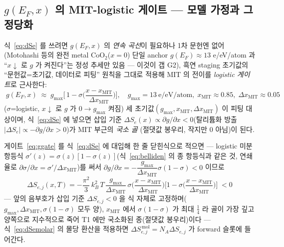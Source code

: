 \subsection{$g(E_F,x)$ 의 MIT-logistic 게이트 --- 모델 가정과 그 정당화}\label{sec:lco-gate}
식~\eqref{eq:dSe} 를 쓰려면 $g(E_F,x)$ 의 \emph{연속 곡선}이 필요하나 1차 문헌엔 없어(Motohashi
등\cite{motohashi2009}의 완전 metal $\mathrm{CoO_2}$($x{=}0$) 단일 anchor $g(E_F)\!\approx\!13$ e/eV/atom 과
``$x\!\downarrow$ 로 $g$ 가 켜진다''는 정성 추세만 있음 --- 이것이 갭 G2), 흑연 staging 초기값의
``문헌값=초기값, 데이터로 피팅'' 원칙을 그대로 적용해 MIT 의 전이를 \emph{logistic 게이트}로 근사한다:
\begin{equation}
\boxed{\;g(E_F,x)\;\approx\;g_{\max}\Big[\,1-\sigma\!\Big(\frac{x-x_\mathrm{MIT}}{\Delta x_\mathrm{MIT}}\Big)\Big],
\quad g_{\max}=13\ \text{e/eV/atom},\;x_\mathrm{MIT}\approx0.85,\;\Delta x_\mathrm{MIT}\approx0.05\;}
\label{eq:ggate}
\end{equation}
($\sigma$=logistic, $x\!\downarrow$ 로 $g$ 가 $0\!\to\!g_{\max}$ 켜짐) 세 초기값$(g_{\max},x_\mathrm{MIT},
\Delta x_\mathrm{MIT})$ 이 피팅 대상이며, 식~\eqref{eq:dSe} 에 넣으면 삽입 기준 $\Delta S_e(x)\propto\partial g
/\partial x<0$(탈리튬화 방출 $|\Delta S_e|\propto-\partial g/\partial x>0$)가 MIT 부근의 \emph{국소 골}
(절댓값 봉우리, 작지만 0 아님)이 된다.

게이트~\eqref{eq:ggate} 를 식~\eqref{eq:dSe} 에 대입해 한 줄 닫힌식으로 적으면 --- logistic 미분 항등식
$\sigma'(z)=\sigma(z)[1-\sigma(z)]$(식~\eqref{eq:belliden} 의 종 항등식과 같은 것, 연쇄율로
$\partial\sigma/\partial x=\sigma'/\Delta x_\mathrm{MIT}$)를 써서 $\partial g/\partial x=-\dfrac{g_{\max}}{\Delta x_\mathrm{MIT}}
\sigma(1-\sigma)<0$ 이므로
\begin{equation}
\boxed{\;\Delta S_{e,j}(x,T)
=-\frac{\pi^2}{3}\,k_B^2\,T\,\frac{g_{\max}}{\Delta x_\mathrm{MIT}}\,
\sigma\!\Big(\frac{x-x_\mathrm{MIT}}{\Delta x_\mathrm{MIT}}\Big)
\Big[1-\sigma\!\Big(\frac{x-x_\mathrm{MIT}}{\Delta x_\mathrm{MIT}}\Big)\Big]\;<0\;}
\label{eq:dSegate}
\end{equation}
--- 앞의 음부호가 삽입 기준 $\Delta S_{e,j}<0$ 을 식 자체로 고정하며($g_{\max},\Delta x_\mathrm{MIT},
\sigma(1-\sigma)$ 모두 양), $x_\mathrm{MIT}$ 에서 $\sigma(1-\sigma)$ 가 최대 $\tfrac14$ 라 골이 가장 깊고 양쪽으로
지수적으로 죽어 T1 에만 국소화된 종(절댓값 봉우리)이다 --- 식~\eqref{eq:dSemolar} 의 몰당 환산을 적용하면
$\Delta S_{e,j}^{\,\mathrm{mol}}=N_A\Delta S_{e,j}$ 가 forward 슬롯에 들어간다.


